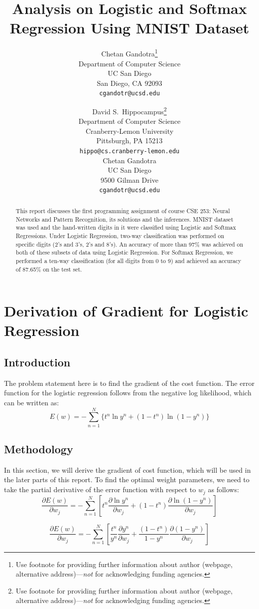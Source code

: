 \documentclass{article}
\title{Analysis on Logistic and Softmax Regression Using MNIST Dataset}
\author{
  Chetan Gandotra\thanks{Use footnote for providing further
    information about author (webpage, alternative
    address)---\emph{not} for acknowledging funding agencies.} \\
  Department of Computer Science\\
  UC San Diego\\
  San Diego, CA 92093 \\
  \texttt{cgandotr@ucsd.edu} \\
}
\author{
  David S.~Hippocampus\thanks{Use footnote for providing further
    information about author (webpage, alternative
    address)---\emph{not} for acknowledging funding agencies.} \\
  Department of Computer Science\\
  Cranberry-Lemon University\\
  Pittsburgh, PA 15213 \\
  \texttt{hippo@cs.cranberry-lemon.edu} \\
  Chetan Gandotra \\
  UC San Diego \\
  9500 Gilman Drive \\
  \texttt{cgandotr@ucsd.edu} \\
}
\begin{document}

\maketitle

\begin{abstract}
  This report discusses the first programming assignment of course CSE 253: Neural Networks and Pattern Recognition, its solutions and the inferences. MNIST dataset was used and the hand-written digits in it were classified using Logistic and Softmax Regressions. Under Logistic Regression, two-way classification was performed on specific digits (2's and 3's, 2's and 8's). An accuracy of more than 97\% was achieved on both of these subsets of data using Logistic Regression. For Softmax Regression, we performed a ten-way classification (for all digits from 0 to 9) and achieved an accuracy of 87.65\% on the test set.
\end{abstract}

\section{Derivation of Gradient for Logistic Regression}

\subsection{Introduction}

The problem statement here is to find the gradient of the cost function. The error function for the logistic regression follows from the negative log likelihood, which can be written as:
$$E(w) = - \sum_{n=1}^{N} \{ t^{n} \ln y^{n} + ( 1-t^{n}) \ln(1-y^n)\}$$

\subsection{Methodology}

In this section, we will derive the gradient of cost function, which will be used in the later parts of this report. To find the optimal weight parameters, we need to take the partial derivative of the error function with respect to $w_{j}$ as follows:
$$\frac{\partial E(w)}{\partial w_j} = - \sum_{n=1}^{N} \left[ t^{n} \frac{\partial \ln y^{n}}{\partial w_j} + ( 1-t^{n}) \frac{\partial \ln(1-y^n)}{\partial w_j}\right]$$

$$\frac{\partial E(w)}{\partial w_j} = - \sum_{n=1}^{N} \left[ \frac{t^{n}}{y^{n}} \frac{\partial y^{n}}{\partial w_j} + \frac{( 1-t^{n})}{1-y^{n}} \frac{\partial (1-y^n)}{\partial w_j}\right]$$
\end{document}
